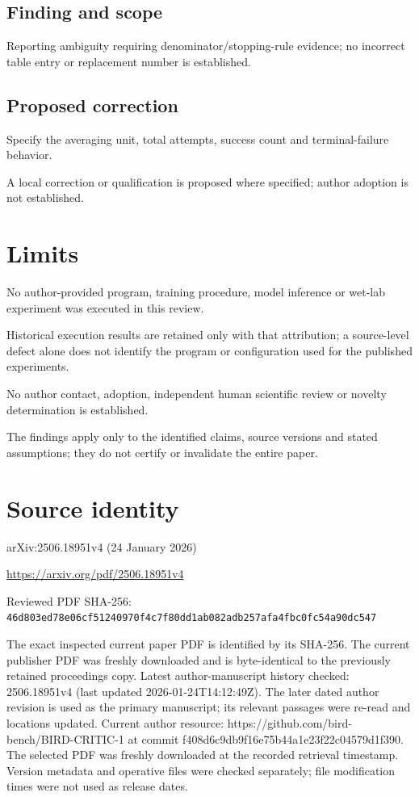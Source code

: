 \documentclass[11pt]{article}
\begin{document}
\subsection*{Finding and scope}

Reporting ambiguity requiring denominator/stopping-rule evidence; no incorrect table entry or replacement number is established.

\subsection*{Proposed correction}

Specify the averaging unit, total attempts, success count and terminal-failure behavior.

A local correction or qualification is proposed where specified; author adoption is not established.

\section*{Limits}

No author-provided program, training procedure, model inference or wet-lab experiment was executed in this review.\par

Historical execution results are retained only with that attribution; a source-level defect alone does not identify the program or configuration used for the published experiments.\par

No author contact, adoption, independent human scientific review or novelty determination is established.\par

The findings apply only to the identified claims, source versions and stated assumptions; they do not certify or invalidate the entire paper.\par

\section*{Source identity}

arXiv:2506.18951v4 (24 January 2026)

\url{https://arxiv.org/pdf/2506.18951v4}

Reviewed PDF SHA-256: \nolinkurl{46d803ed78e06cf51240970f4c7f80dd1ab082adb257afa4fbc0fc54a90dc547}

The exact inspected current paper PDF is identified by its SHA-256. The current publisher PDF was freshly downloaded and is byte-identical to the previously retained proceedings copy. Latest author-manuscript history checked: 2506.18951v4 (last updated 2026-01-24T14:12:49Z). The later dated author revision is used as the primary manuscript; its relevant passages were re-read and locations updated. Current author resource: https://github.com/bird-bench/BIRD-CRITIC-1 at commit f408d6c9db9f16e75b44a1e23f22c04579d1f390.  The selected PDF was freshly downloaded at the recorded retrieval timestamp. Version metadata and operative files were checked separately; file modification times were not used as release dates.
\end{document}

